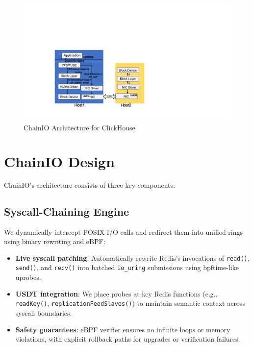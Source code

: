 \documentclass[sigconf,10pt]{acmart}
\newcommand{\sys}{ChainIO\xspace}
\begin{document}
\begin{figure}[h]
\centering
\includegraphics[width=\columnwidth]{img/bur.pdf}
\caption{\sys Architecture for ClickHouse}\label{fig:bur}
\end{figure}

\section{\sys Design}\label{sec:design}

\sys's architecture consists of three key components:

\subsection{Syscall-Chaining Engine}

We dynamically intercept POSIX I/O calls and redirect them into unified rings using binary rewriting and eBPF:

\begin{itemize}[leftmargin=*,itemsep=0pt]
  \item \textbf{Live syscall patching}: Automatically rewrite Redis's invocations of \texttt{read()}, \texttt{send()}, and \texttt{recv()} into batched \texttt{io\_uring} submissions using bpftime-like uprobes.
  
  \item \textbf{USDT integration}: We place probes at key Redis functions (e.g., \texttt{readKey()}, \texttt{replicationFeedSlaves()}) to maintain semantic context across syscall boundaries.
  
  \item \textbf{Safety guarantees}: eBPF verifier ensures no infinite loops or memory violations, with explicit rollback paths for upgrades or verification failures.
\end{itemize}
\end{document}
